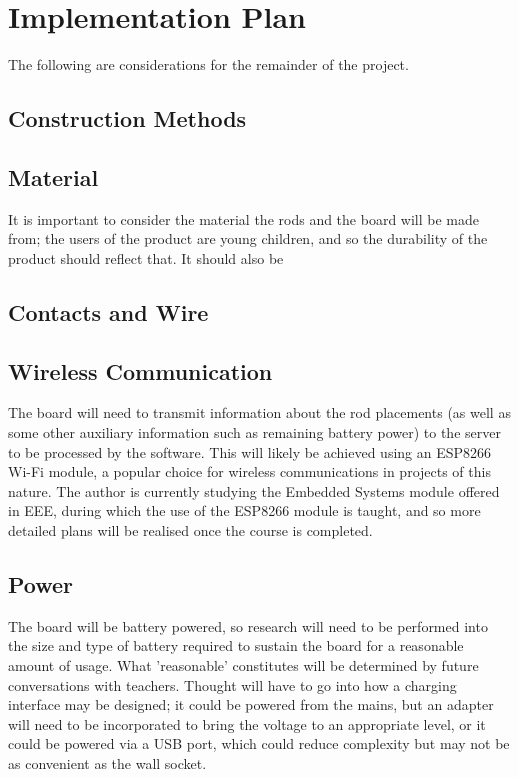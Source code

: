 \chapter{Implementation Plan}
The following are considerations for the remainder of the project.

\section{Construction Methods}


\section{Material}
It is important to consider the material the rods and the board will be made from; the users of the product are young children, and so the durability of the product should reflect that. It should also be 

\section{Contacts and Wire}



\section{Wireless Communication}
The board will need to transmit information about the rod placements (as well as some other auxiliary information such as remaining battery power) to the server to be processed by the software. This will likely be achieved using an ESP8266 Wi-Fi module, a popular choice for wireless communications in projects of this nature. The author is currently studying the Embedded Systems module offered in EEE, during which the use of the ESP8266 module is taught, and so more detailed plans will be realised once the course is completed.

\section{Power}
The board will be battery powered, so research will need to be performed into the size and type of battery required to sustain the board for a reasonable amount of usage. What 'reasonable' constitutes will be determined by future conversations with teachers. Thought will have to go into how a charging interface may be designed; it could be powered from the mains, but an adapter will need to be incorporated to bring the voltage to an appropriate level, or it could be powered via a USB port, which could reduce complexity but may not be as convenient as the wall socket.



